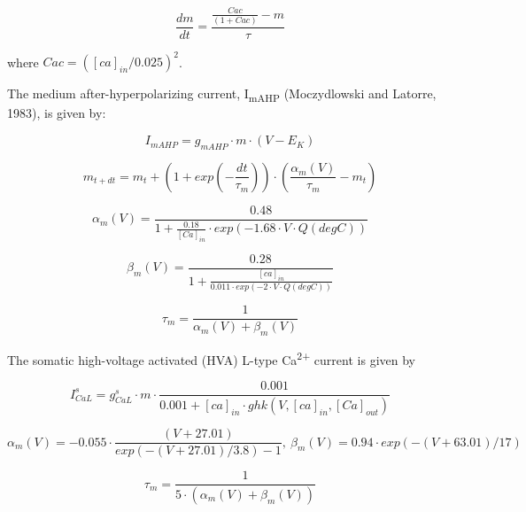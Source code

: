 \documentclass[12pt]{article}
\begin{document}
\begin{equation}
\frac{dm}{dt}=\frac{\frac{Cac}{(1+Cac)}-m}{\tau}
\end{equation}


where 
$Cac=([ca]_{in}/0.025)^2$.



The medium after-hyperpolarizing current, I\textsubscript{mAHP} (Moczydlowski and Latorre, 1983), is given by:


\begin{equation}
I_{mAHP}= g_{mAHP}\cdot m\cdot
(V-E_K)
\end{equation}

\begin{equation}
m_{t+dt}=m_t+(1+exp(-\frac{dt}{\tau_m}))\cdot (\frac{\alpha_m(V)}{\tau_m}-m_t)
\end{equation}

\begin{equation}
\alpha_m(V)=\frac{0.48}{1+\frac{0.18}{[Ca]_{in}}\cdot
	exp(-1.68\cdot V\cdot Q(degC))}
\end{equation}

\begin{equation}
\beta_m(V)=\frac{0.28}{1+\frac{[ca]_{in}}{0.011\cdot
		exp(-2\cdot V\cdot Q(degC))}}
\end{equation}

\begin{equation}
\tau_m=\frac {1}{\alpha_m(V)+\beta_m(V)}
\end{equation}

The somatic high-voltage activated (HVA) L-type Ca\textsuperscript{2+} current is given by


\begin{equation}
I_{CaL}^s= g_{CaL}^s\cdot m\cdot
\frac{0.001 }{0.001 + [ca]_{in}\cdot
	ghk(V, [ca]_{in}, [Ca]_{out})}
\end{equation}

\begin{equation}
\alpha_m(V)=-0.055\cdot \frac{(V+27.01)}{exp(-(V+27.01)/3.8)-1} , \  \beta_m(V)=0.94\cdot exp(-(V+63.01)/17)
\end{equation}

\begin{equation}
\tau_m=\frac {1}{5\cdot (\alpha_m(V)+\beta_m(V))}
\end{equation}
\end{document}
